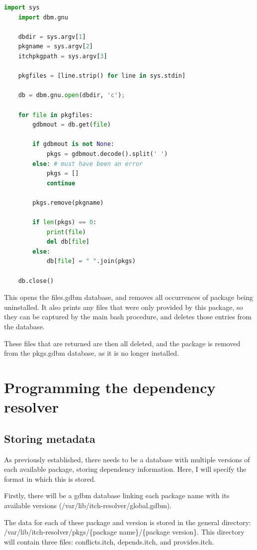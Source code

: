 \documentclass[10pt]{article}
\begin{document}
\begin{lstlisting}[language=python]
    import sys
    import dbm.gnu

    dbdir = sys.argv[1]
    pkgname = sys.argv[2]
    itchpkgpath = sys.argv[3]

    pkgfiles = [line.strip() for line in sys.stdin]

    db = dbm.gnu.open(dbdir, 'c');

    for file in pkgfiles:
        gdbmout = db.get(file)

        if gdbmout is not None:
            pkgs = gdbmout.decode().split(' ')
        else: # must have been an error
            pkgs = []
            continue

        pkgs.remove(pkgname)

        if len(pkgs) == 0:
            print(file)
            del db[file]
        else:
            db[file] = " ".join(pkgs)

    db.close()
\end{lstlisting}

This opens the files.gdbm database, and removes all occurrences of package being uninstalled. It also prints any files that were only provided by this package, so they can be captured by the main bash procedure, and deletes those entries from the database.

These files that are returned are then all deleted, and the package is removed from the pkgs.gdbm database, as it is no longer installed.

\section{Programming the dependency resolver}

\subsection{Storing metadata} \label{ResolverMetadataSS}

As previously established, there needs to be a database with multiple versions of each available package, storing dependency information. Here, I will specify the format in which this is stored.

Firstly, there will be a gdbm database linking each package name with its available versions (/var/lib/itch-resolver/global.gdbm).

The data for each of these package and version is stored in the general directory: /var/lib/itch-resolver/pkgs/\{package name\}/\{package version\}. This directory will contain three files: conflicts.itch, depends.itch, and provides.itch.
\end{document}
